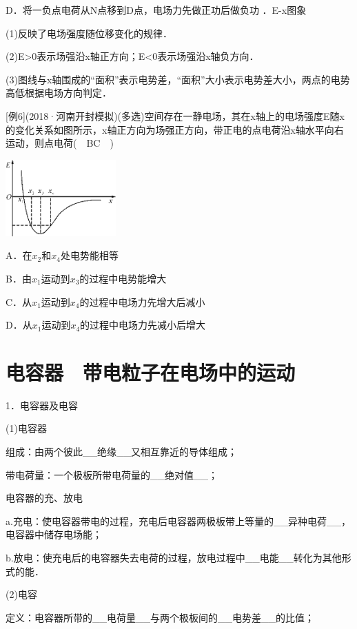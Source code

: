 \documentclass[cn,10.5pt,chinese,mac,chinesefont=founder]{elegantbook}
\begin{document}
D．将一负点电荷从N点移到D点，电场力先做正功后做负功
．E-x图象

(1)反映了电场强度随位移变化的规律．

(2)E\textgreater0表示场强沿x轴正方向；E\textless0表示场强沿x轴负方向．

(3)图线与x轴围成的``面积''表示电势差，``面积''大小表示电势差大小，两点的电势高低根据电场方向判定．

{[}例6{]}(2018·河南开封模拟)(多选)空间存在一静电场，其在x轴上的电场强度E随x的变化关系如图所示，x轴正方向为场强正方向，带正电的点电荷沿x轴水平向右运动，则点电荷(　BC　)

\begin{center}\includegraphics[width=1.66667in,height=1.15625in]{media/image286.png}\end{center}

A．在$x_2$和$x_4$处电势能相等

B．由$x_1$运动到$x_3$的过程中电势能增大

C．从$x_1$运动到$x_4$的过程中电场力先增大后减小

D．从$x_1$运动到$x_4$的过程中电场力先减小后增大

\newpage
\section{电容器　带电粒子在电场中的运动}





1．电容器及电容

(1)电容器

组成：由两个彼此\_\_绝缘\_\_又相互靠近的导体组成；

带电荷量：一个极板所带电荷量的\_\_绝对值\_\_；

电容器的充、放电

a.充电：使电容器带电的过程，充电后电容器两极板带上等量的\_\_异种电荷\_\_，电容器中储存电场能；

b.放电：使充电后的电容器失去电荷的过程，放电过程中\_\_电能\_\_转化为其他形式的能．

(2)电容

定义：电容器所带的\_\_电荷量\_\_与两个极板间的\_\_电势差\_\_的比值；
\end{document}
